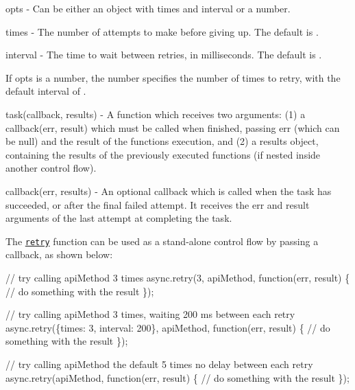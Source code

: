 \begin{DoxyItemize}
\item {\ttfamily opts} -\/ Can be either an object with {\ttfamily times} and {\ttfamily interval} or a number.
\begin{DoxyItemize}
\item {\ttfamily times} -\/ The number of attempts to make before giving up. The default is {}.
\item {\ttfamily interval} -\/ The time to wait between retries, in milliseconds. The default is {}.
\item If {\ttfamily opts} is a number, the number specifies the number of times to retry, with the default interval of {}.
\end{DoxyItemize}
\item {\ttfamily task(callback, results)} -\/ A function which receives two arguments\+: (1) a {\ttfamily callback(err, result)} which must be called when finished, passing {\ttfamily err} (which can be {\ttfamily null}) and the {\ttfamily result} of the function\textquotesingle{}s execution, and (2) a {\ttfamily results} object, containing the results of the previously executed functions (if nested inside another control flow).
\item {\ttfamily callback(err, results)} -\/ An optional callback which is called when the task has succeeded, or after the final failed attempt. It receives the {\ttfamily err} and {\ttfamily result} arguments of the last attempt at completing the {\ttfamily task}.
\end{DoxyItemize}

The \href{#retry}{\tt {\ttfamily retry}} function can be used as a stand-\/alone control flow by passing a callback, as shown below\+:


\begin{DoxyCode}
// try calling apiMethod 3 times
async.retry(3, apiMethod, function(err, result) \{
    // do something with the result
\});
\end{DoxyCode}



\begin{DoxyCode}
// try calling apiMethod 3 times, waiting 200 ms between each retry 
async.retry(\{times: 3, interval: 200\}, apiMethod, function(err, result) \{
    // do something with the result
\});
\end{DoxyCode}



\begin{DoxyCode}
// try calling apiMethod the default 5 times no delay between each retry 
async.retry(apiMethod, function(err, result) \{
    // do something with the result
\});
\end{DoxyCode}


